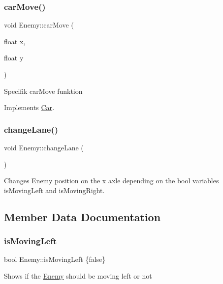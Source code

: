 \subsubsection{\texorpdfstring{car\+Move()}{carMove()}}
{\footnotesize\ttfamily void Enemy\+::car\+Move (\begin{DoxyParamCaption}\item[{float}]{x,  }\item[{float}]{y }\end{DoxyParamCaption})\hspace{0.3cm}{\ttfamily [virtual]}}

Specifik car\+Move funktion 

Implements \hyperlink{classCar_a9650df764ceee00f738b888a7a976996}{Car}.

\mbox{\label{classEnemy_a58402ae6b3e519ecad7d1c61961a4904}} 
\subsubsection{\texorpdfstring{change\+Lane()}{changeLane()}}
{\footnotesize\ttfamily void Enemy\+::change\+Lane (\begin{DoxyParamCaption}{ }\end{DoxyParamCaption})}

Changes \hyperlink{classEnemy}{Enemy} position on the x axle depending on the bool variables is\+Moving\+Left and is\+Moving\+Right. 

\subsection{Member Data Documentation}
\mbox{\label{classEnemy_a2d4bfba6681a78723c61c284a5e1f2d5}} 
\subsubsection{\texorpdfstring{is\+Moving\+Left}{isMovingLeft}}
{\footnotesize\ttfamily bool Enemy\+::is\+Moving\+Left \{false\}}

Shows if the \hyperlink{classEnemy}{Enemy} should be moving left or not \mbox{\label{classEnemy_a69ab0772337c6de349a6a412d10876e7}} 
